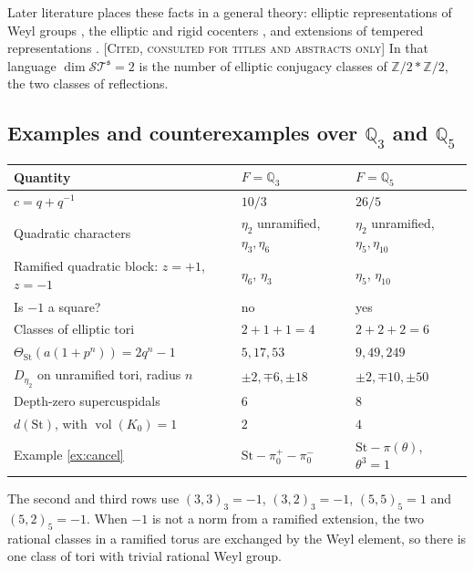 \documentclass[12pt,letterpaper]{amsart}
\numberwithin{equation}{section}
\theoremstyle{definition}
\theoremstyle{remark}
\newcommand{\St}{\mathrm{St}}
\newcommand{\ST}{\mathcal{ST}}
\newcommand{\vol}{\operatorname{vol}}
\newcommand{\status}[1]{\textup{[\textsc{#1}]}}
\begin{document}
Later literature places these facts in a general theory: elliptic representations of Weyl groups \cite{Re01}, the elliptic and rigid cocenters \cite{CH17,CH21}, and extensions of tempered representations \cite{OS13}. \status{Cited, consulted for titles and abstracts only} In that language $\dim\ST^{\mathfrak s}=2$ is the number of elliptic conjugacy classes of $\mathbb Z/2*\mathbb Z/2$, the two classes of reflections.

\subsection{Examples and counterexamples over $\mathbb Q_3$ and $\mathbb Q_5$}\label{sub:counter}
\begin{center}\small
\begin{tabular}{@{}p{.36\linewidth}p{.27\linewidth}p{.27\linewidth}@{}}\toprule
Quantity & $F=\mathbb Q_3$ & $F=\mathbb Q_5$\\\midrule
$c=q+q^{-1}$ & $10/3$ & $26/5$\\
Quadratic characters & $\eta_2$ unramified, $\eta_3,\eta_6$ & $\eta_2$ unramified, $\eta_5,\eta_{10}$\\
Ramified quadratic block: $z=+1$, $z=-1$ & $\eta_6$, $\eta_3$ & $\eta_5$, $\eta_{10}$\\
Is $-1$ a square? & no & yes\\
Classes of elliptic tori & $2+1+1=4$ & $2+2+2=6$\\
$\Theta_{\St}(a(1+p^n))=2q^n-1$ & $5,17,53$ & $9,49,249$\\
$D_{\eta_2}$ on unramified tori, radius $n$ & $\pm2,\mp6,\pm18$ & $\pm2,\mp10,\pm50$\\
Depth-zero supercuspidals & $6$ & $8$\\
$d(\St)$, with $\vol(K_0)=1$ & $2$ & $4$\\
Example \ref{ex:cancel} & $\St-\pi_0^+-\pi_0^-$ & $\St-\pi(\theta)$, $\theta^3=1$\\\bottomrule
\end{tabular}
\end{center}
The second and third rows use $(3,3)_3=-1$, $(3,2)_3=-1$, $(5,5)_5=1$ and $(5,2)_5=-1$. When $-1$ is not a norm from a ramified extension, the two rational classes in a ramified torus are exchanged by the Weyl element, so there is one class of tori with trivial rational Weyl group.
\end{document}

